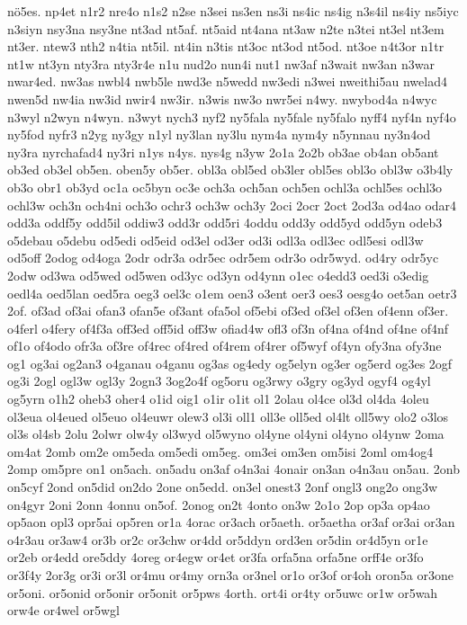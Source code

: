 {nö5es.
np4et
n1r2
nre4o
n1s2
n2se
n3sei
ns3en
ns3i
ns4ic
ns4ig
n3s4il
ns4iy
ns5iyc
n3siyn
nsy3na
nsy3ne
nt3ad
nt5af.
nt5aid
nt4ana
nt3aw
n2te
n3tei
nt3el
nt3em
nt3er.
ntew3
nth2
n4tia
nt5il.
nt4in
n3tis
nt3oc
nt3od
nt5od.
nt3oe
n4t3or
n1tr
nt1w
nt3yn
nty3ra
nty3r4e
n1u
nud2o
nun4i
nut1
nw3af
n3wait
nw3an
n3war
nwar4ed.
nw3as
nwbl4
nwb5le
nwd3e
n5wedd
nw3edi
n3wei
nweithi5au
nwelad4
nwen5d
nw4ia
nw3id
nwir4
nw3ir.
n3wis
nw3o
nwr5ei
n4wy.
nwybod4a
n4wyc
n3wyl
n2wyn
n4wyn.
n3wyt
nych3
nyf2
ny5fala
ny5fale
ny5falo
nyff4
nyf4n
nyf4o
ny5fod
nyfr3
n2yg
ny3gy
n1yl
ny3lan
ny3lu
nym4a
nym4y
n5ynnau
ny3n4od
ny3ra
nyrchafad4
ny3ri
n1ys
n4ys.
nys4g
n3yw
2o1a
2o2b
ob3ae
ob4an
ob5ant
ob3ed
ob3el
ob5en.
oben5y
ob5er.
obl3a
obl5ed
ob3ler
obl5es
obl3o
obl3w
o3b4ly
ob3o
obr1
ob3yd
oc1a
oc5byn
oc3e
och3a
och5an
och5en
ochl3a
ochl5es
ochl3o
ochl3w
och3n
och4ni
och3o
ochr3
och3w
och3y
2oci
2ocr
2oct
2od3a
od4ao
odar4
odd3a
oddf5y
odd5il
oddiw3
odd3r
odd5ri
4oddu
odd3y
odd5yd
odd5yn
odeb3
o5debau
o5debu
od5edi
od5eid
od3el
od3er
od3i
odl3a
odl3ec
odl5esi
odl3w
od5off
2odog
od4oga
2odr
odr3a
odr5ec
odr5em
odr3o
odr5wyd.
od4ry
odr5yc
2odw
od3wa
od5wed
od5wen
od3yc
od3yn
od4ynn
o1ec
o4edd3
oed3i
o3edig
oedl4a
oed5lan
oed5ra
oeg3
oel3c
o1em
oen3
o3ent
oer3
oes3
oesg4o
oet5an
oetr3
2of.
of3ad
of3ai
ofan3
ofan5e
of3ant
ofa5ol
of5ebi
of3ed
of3el
of3en
of4enn
of3er.
o4ferl
o4fery
of4f3a
off3ed
off5id
off3w
ofiad4w
ofl3
of3n
of4na
of4nd
of4ne
of4nf
of1o
of4odo
ofr3a
of3re
of4rec
of4red
of4rem
of4rer
of5wyf
of4yn
ofy3na
ofy3ne
og1
og3ai
og2an3
o4ganau
o4ganu
og3as
og4edy
og5elyn
og3er
og5erd
og3es
2ogf
og3i
2ogl
ogl3w
ogl3y
2ogn3
3og2o4f
og5oru
og3rwy
o3gry
og3yd
ogyf4
og4yl
og5yrn
o1h2
oheb3
oher4
o1id
oig1
o1ir
o1it
ol1
2olau
ol4ce
ol3d
ol4da
4oleu
ol3eua
ol4eued
ol5euo
ol4euwr
olew3
ol3i
oll1
oll3e
oll5ed
ol4lt
oll5wy
olo2
o3los
ol3s
ol4sb
2olu
2olwr
olw4y
ol3wyd
ol5wyno
ol4yne
ol4yni
ol4yno
ol4ynw
2oma
om4at
2omb
om2e
om5eda
om5edi
om5eg.
om3ei
om3en
om5isi
2oml
om4og4
2omp
om5pre
on1
on5ach.
on5adu
on3af
o4n3ai
4onair
on3an
o4n3au
on5au.
2onb
on5cyf
2ond
on5did
on2do
2one
on5edd.
on3el
onest3
2onf
ongl3
ong2o
ong3w
on4gyr
2oni
2onn
4onnu
on5of.
2onog
on2t
4onto
on3w
2o1o
2op
op3a
op4ao
op5aon
opl3
opr5ai
op5ren
or1a
4orac
or3ach
or5aeth.
or5aetha
or3af
or3ai
or3an
o4r3au
or3aw4
or3b
or2c
or3chw
or4dd
or5ddyn
ord3en
or5din
or4d5yn
or1e
or2eb
or4edd
ore5ddy
4oreg
or4egw
or4et
or3fa
orfa5na
orfa5ne
orff4e
or3fo
or3f4y
2or3g
or3i
or3l
or4mu
or4my
orn3a
or3nel
or1o
or3of
or4oh
oron5a
or3one
or5oni.
or5onid
or5onir
or5onit
or5pws
4orth.
ort4i
or4ty
or5uwc
or1w
or5wah
orw4e
or4wel
or5wgl
}
